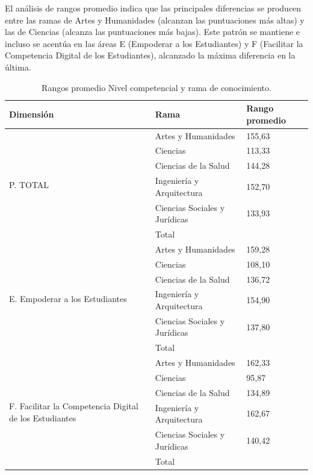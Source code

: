 \documentclass[spanish]{textolivre}
\begin{document}
El análisis de rangos promedio indica que las principales diferencias se producen entre las ramas de Artes y Humanidades (alcanzan las puntuaciones más altas) y las de Ciencias (alcanza las puntuaciones más bajas). Este patrón se mantiene e incluso se acentúa en las áreas E (Empoderar a los Estudiantes) y F (Facilitar la Competencia Digital de los Estudiantes), alcanzado la máxima diferencia en la última.

\begin{table}[htpb]
\caption{Rangos promedio Nivel competencial y rama de conocimiento.}
\label{tab10}
\centering
\begin{tabular}{p{}p{}p{}}
\toprule
Dimensión & Rama & Rango promedio
\\
\midrule
\multirow{6}{=}{P. TOTAL} & Artes y Humanidades & 155,63
\\
& Ciencias & 113,33
\\
& Ciencias de la Salud & 144,28
\\
& Ingeniería y Arquitectura & 152,70
\\
& Ciencias Sociales y Jurídicas & 133,93
\\
& Total & 
\\
\midrule
\multirow{6}{=}{E. Empoderar a los Estudiantes} & Artes y Humanidades & 159,28
\\
& Ciencias & 108,10
\\
& Ciencias de la Salud & 136,72
\\
& Ingeniería y Arquitectura & 154,90
\\
& Ciencias Sociales y Jurídicas & 137,80
\\
& Total &
\\
\midrule
\multirow{6}{=}{F. Facilitar la Competencia Digital de los Estudiantes} & Artes y Humanidades & 162,33
\\
& Ciencias & 95,87
\\
& Ciencias de la Salud & 134,89
\\
& Ingeniería y Arquitectura & 162,67
\\
& Ciencias Sociales y Jurídicas & 140,42
\\
& Total &
\\ 
\bottomrule
\end{tabular}
\end{table}
\end{document}
